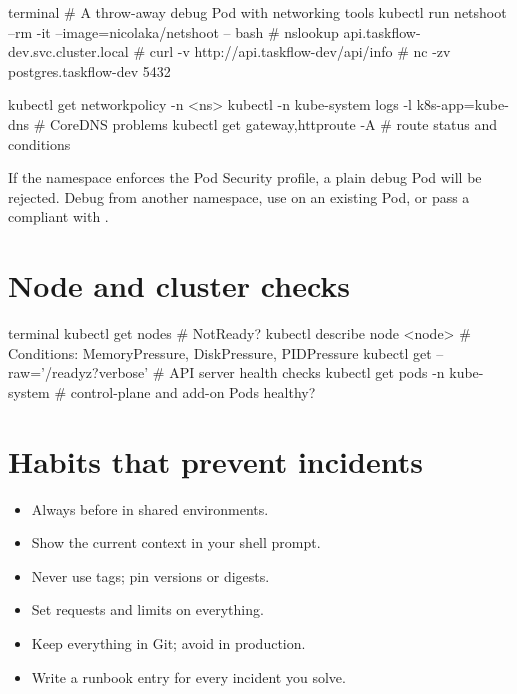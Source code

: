 \begin{bashcode}{terminal}
# A throw-away debug Pod with networking tools
kubectl run netshoot --rm -it --image=nicolaka/netshoot -- bash
#   nslookup api.taskflow-dev.svc.cluster.local
#   curl -v http://api.taskflow-dev/api/info
#   nc -zv postgres.taskflow-dev 5432

kubectl get networkpolicy -n <ns>
kubectl -n kube-system logs -l k8s-app=kube-dns          # CoreDNS problems
kubectl get gateway,httproute -A                          # route status and conditions
\end{bashcode}

\begin{warningbox}
If the namespace enforces the  Pod Security profile, a plain
 debug Pod will be rejected. Debug from another namespace, use
 on an existing Pod, or pass a compliant 
with .
\end{warningbox}

\section{Node and cluster checks}

\begin{bashcode}{terminal}
kubectl get nodes                                  # NotReady?
kubectl describe node <node>                       # Conditions: MemoryPressure, DiskPressure, PIDPressure
kubectl get --raw='/readyz?verbose'                # API server health checks
kubectl get pods -n kube-system                    # control-plane and add-on Pods healthy?
\end{bashcode}

\section{Habits that prevent incidents}

\begin{itemize}
  \item Always  before  in shared environments.
  \item Show the current context in your shell prompt.
  \item Never use  tags; pin versions or digests.
  \item Set requests and limits on everything.
  \item Keep everything in Git; avoid  in production.
  \item Write a runbook entry for every incident you solve.
\end{itemize}
